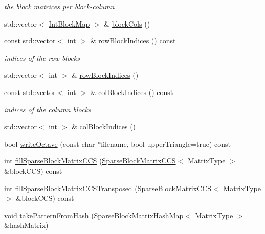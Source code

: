 \begin{DoxyCompactItemize}
\begin{DoxyCompactList}\small\item\em the block matrices per block-\/column \end{DoxyCompactList}\item 
std\+::vector$<$ \mbox{\hyperlink{classg2o_1_1_sparse_block_matrix_aaa6ca1ae454ed70f62992b6401645f4e}{Int\+Block\+Map}} $>$ \& \mbox{\hyperlink{classg2o_1_1_sparse_block_matrix_a31236f3e11cb7af4979d68fdba3d5e33}{block\+Cols}} ()
\item 
const std\+::vector$<$ int $>$ \& \mbox{\hyperlink{classg2o_1_1_sparse_block_matrix_a4fff500693b46e4f62a2f828934d198c}{row\+Block\+Indices}} () const
\begin{DoxyCompactList}\small\item\em indices of the row blocks \end{DoxyCompactList}\item 
std\+::vector$<$ int $>$ \& \mbox{\hyperlink{classg2o_1_1_sparse_block_matrix_a03a2cfdb856c2dac4875889d55ecda84}{row\+Block\+Indices}} ()
\item 
const std\+::vector$<$ int $>$ \& \mbox{\hyperlink{classg2o_1_1_sparse_block_matrix_a1dc1115273da4863f4625b1dc9569d89}{col\+Block\+Indices}} () const
\begin{DoxyCompactList}\small\item\em indices of the column blocks \end{DoxyCompactList}\item 
std\+::vector$<$ int $>$ \& \mbox{\hyperlink{classg2o_1_1_sparse_block_matrix_aba255bdbb8e0a0d2802ae27e6d4f7cc7}{col\+Block\+Indices}} ()
\item 
bool \mbox{\hyperlink{classg2o_1_1_sparse_block_matrix_a21725f29b3f1bbc4e4ba77ee3f960ddc}{write\+Octave}} (const char $\ast$filename, bool upper\+Triangle=true) const
\item 
int \mbox{\hyperlink{classg2o_1_1_sparse_block_matrix_a783a9c976391f0c698866e34eeef43f5}{fill\+Sparse\+Block\+Matrix\+C\+CS}} (\mbox{\hyperlink{classg2o_1_1_sparse_block_matrix_c_c_s}{Sparse\+Block\+Matrix\+C\+CS}}$<$ Matrix\+Type $>$ \&block\+C\+CS) const
\item 
int \mbox{\hyperlink{classg2o_1_1_sparse_block_matrix_a3808d27b1def55e9dd6e26b678d8f728}{fill\+Sparse\+Block\+Matrix\+C\+C\+S\+Transposed}} (\mbox{\hyperlink{classg2o_1_1_sparse_block_matrix_c_c_s}{Sparse\+Block\+Matrix\+C\+CS}}$<$ Matrix\+Type $>$ \&block\+C\+CS) const
\item 
void \mbox{\hyperlink{classg2o_1_1_sparse_block_matrix_a0b1e9dc3a24b0ab41d7002396a61c833}{take\+Pattern\+From\+Hash}} (\mbox{\hyperlink{classg2o_1_1_sparse_block_matrix_hash_map}{Sparse\+Block\+Matrix\+Hash\+Map}}$<$ Matrix\+Type $>$ \&hash\+Matrix)
\end{DoxyCompactItemize}
